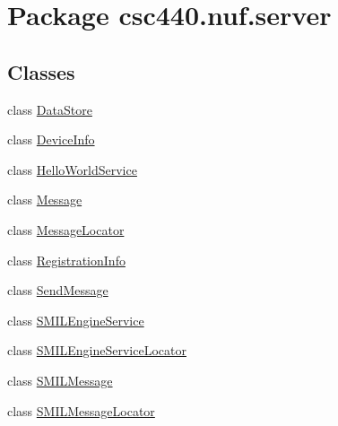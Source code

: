 \hypertarget{namespacecsc440_1_1nuf_1_1server}{\section{Package csc440.\-nuf.\-server}
\label{namespacecsc440_1_1nuf_1_1server}
}
\subsection*{Classes}
\begin{DoxyCompactItemize}
\item 
class \hyperlink{classcsc440_1_1nuf_1_1server_1_1_data_store}{Data\-Store}
\item 
class \hyperlink{classcsc440_1_1nuf_1_1server_1_1_device_info}{Device\-Info}
\item 
class \hyperlink{classcsc440_1_1nuf_1_1server_1_1_hello_world_service}{Hello\-World\-Service}
\item 
class \hyperlink{classcsc440_1_1nuf_1_1server_1_1_message}{Message}
\item 
class \hyperlink{classcsc440_1_1nuf_1_1server_1_1_message_locator}{Message\-Locator}
\item 
class \hyperlink{classcsc440_1_1nuf_1_1server_1_1_registration_info}{Registration\-Info}
\item 
class \hyperlink{classcsc440_1_1nuf_1_1server_1_1_send_message}{Send\-Message}
\item 
class \hyperlink{classcsc440_1_1nuf_1_1server_1_1_s_m_i_l_engine_service}{S\-M\-I\-L\-Engine\-Service}
\item 
class \hyperlink{classcsc440_1_1nuf_1_1server_1_1_s_m_i_l_engine_service_locator}{S\-M\-I\-L\-Engine\-Service\-Locator}
\item 
class \hyperlink{classcsc440_1_1nuf_1_1server_1_1_s_m_i_l_message}{S\-M\-I\-L\-Message}
\item 
class \hyperlink{classcsc440_1_1nuf_1_1server_1_1_s_m_i_l_message_locator}{S\-M\-I\-L\-Message\-Locator}
\end{DoxyCompactItemize}
